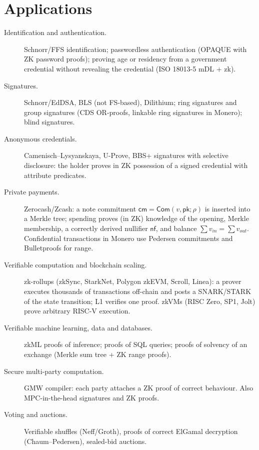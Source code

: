 \documentclass[11pt,a4paper]{report}
\theoremstyle{plain}
\theoremstyle{definition}
\theoremstyle{remark}
\begin{document}
\section{Applications}
\begin{description}
\item[Identification and authentication.] Schnorr/FFS identification; passwordless authentication (OPAQUE with ZK password proofs); proving age or residency from a government credential without revealing the credential (ISO 18013-5 mDL + zk).
\item[Signatures.] Schnorr/EdDSA, BLS (not FS-based), Dilithium; ring signatures and group signatures (CDS OR-proofs, linkable ring signatures in Monero); blind signatures.
\item[Anonymous credentials.] Camenisch--Lysyanskaya, U-Prove, BBS+ signatures with selective disclosure: the holder proves in ZK possession of a signed credential with attribute predicates.
\item[Private payments.] Zerocash/Zcash: a note commitment $\mathsf{cm}=\mathsf{Com}(v,\mathsf{pk};\rho)$ is inserted into a Merkle tree; spending proves (in ZK) knowledge of the opening, Merkle membership, a correctly derived nullifier $\mathsf{nf}$, and balance $\sum v_{in}=\sum v_{out}$. Confidential transactions in Monero use Pedersen commitments and Bulletproofs for range.
\item[Verifiable computation and blockchain scaling.] zk-rollups (zkSync, StarkNet, Polygon zkEVM, Scroll, Linea): a prover executes thousands of transactions off-chain and posts a SNARK/STARK of the state transition; L1 verifies one proof. zkVMs (RISC Zero, SP1, Jolt) prove arbitrary RISC-V execution.
\item[Verifiable machine learning, data and databases.] zkML proofs of inference; proofs of SQL queries; proofs of solvency of an exchange (Merkle sum tree + ZK range proofs).
\item[Secure multi-party computation.] GMW compiler: each party attaches a ZK proof of correct behaviour. Also MPC-in-the-head signatures and ZK proofs.
\item[Voting and auctions.] Verifiable shuffles (Neff/Groth), proofs of correct ElGamal decryption (Chaum--Pedersen), sealed-bid auctions.
\end{description}
\end{document}
